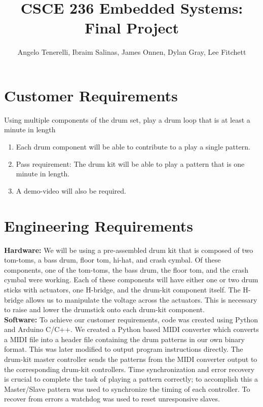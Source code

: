 \documentclass[]{article}
\title{CSCE 236 Embedded Systems: Final Project}
\author{Angelo Tenerelli, Ibraim Salinas, James Onnen, Dylan Gray, Lee Fitchett}
\begin{document}
\maketitle
\newpage

\tableofcontents
{} 

\newpage
\setcounter{page}{1}


\section{Customer Requirements}
	Using multiple components of the drum set, play a drum loop that is at least a minute in length
\begin{enumerate}
	\item  Each drum component will be able to contribute to a play a single pattern.
	\item Pass	requirement: The drum kit will be able to play a pattern that is one minute in length.
	\item A demo-video will also be required.
\end{enumerate}
	
\section{Engineering Requirements}
\noindent \textbf{Hardware:} We will be using a pre-assembled drum kit that is composed of two tom-toms, a bass drum, floor tom, hi-hat, and crash cymbal. Of these components, one of the tom-toms, the bass drum, the floor tom, and the crash cymbal were working. Each of these components will have either one or two drum sticks with actuators, one H-bridge, and the drum-kit component itself. The H-bridge allows us to manipulate the voltage across the actuators. This is necessary to raise and lower the drumstick onto each drum-kit component.\\[1em]

\noindent\textbf{Software:} To achieve our customer requirements, code was created using Python and Arduino C/C++. We created a Python based MIDI converter which converts a MIDI file into a header file containing the drum patterns in our own binary format. This was later modified to output program instructions directly. The drum-kit master controller sends the patterns from the MIDI converter output to the corresponding drum-kit controllers. Time synchronization and error recovery is crucial to complete the task of playing a pattern correctly; to accomplish this a Master/Slave pattern was used to synchronize the timing of each controller. To recover from errors a watchdog was used to reset unresponsive slaves.
\end{document}
